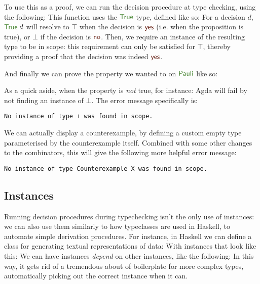 To use this as a proof, we can run the decision procedure at type checking,
using the following:
This function uses the \(\AgdaDatatype{True}\) type, defined like so:
For a decision \(d\), \(\AgdaDatatype{True}\; d\) will resolve to \(\top\) when
the decision is \(\AgdaInductiveConstructor{yes}\) (i.e. when the proposition is
true), or \(\bot\) if the decision is \(\AgdaInductiveConstructor{no}\).
Then, we require an instance of the resulting type to be in scope: this
requirement can only be satisfied for \(\top\), thereby providing a proof that
the decision was indeed \(\AgdaInductiveConstructor{yes}\).

And finally we can prove the property we wanted to on \(\AgdaDatatype{Pauli}\)
like so:

As a quick aside, when the property is \emph{not} true, for instance:
Agda will fail by not finding an instance of \(\bot\).
The error message specifically is:
\begin{displayquote}
  \verb+No instance of type ⊥ was found in scope.+
\end{displayquote}
We can actually display a counterexample, by defining a custom empty type
parameterised by the counterexample itself.
Combined with some other changes to the combinators, this will give the
following more helpful error message:
\begin{displayquote}
  \verb+No instance of type Counterexample X was found in scope.+
\end{displayquote}
\subsection{Instances}
Running decision procedures during typechecking isn't the only use of instances:
we can also use them similarly to how typeclasses are used in Haskell, to
automate simple derivation procedures.
For instance, in Haskell we can define a class for generating textual
representations of data:
With instances that look like this:
We can have instances \emph{depend} on other instances, like the following:
In this way, it gets rid of a tremendous about of boilerplate for more complex
types, automatically picking out the correct instance when it can.


